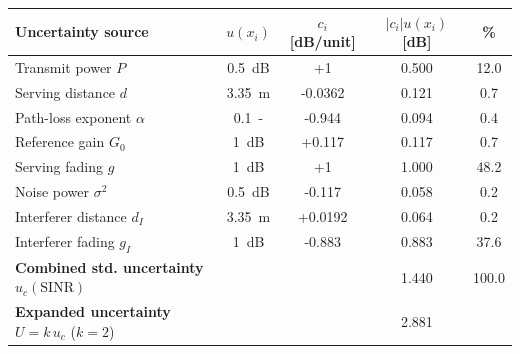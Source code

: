 \begin{tabular}{lcccc}
\hline
\textbf{Uncertainty source} & \textbf{$u(x_i)$} & \textbf{$c_i$ [dB/unit]} & \textbf{$|c_i|u(x_i)$ [dB]} & \textbf{\%} \\
\hline
Transmit power $P$ & 0.5~dB & +1 & 0.500 & 12.0 \\
Serving distance $d$ & 3.35~m & -0.0362 & 0.121 & 0.7 \\
Path-loss exponent $\alpha$ & 0.1~- & -0.944 & 0.094 & 0.4 \\
Reference gain $G_0$ & 1~dB & +0.117 & 0.117 & 0.7 \\
Serving fading $g$ & 1~dB & +1 & 1.000 & 48.2 \\
Noise power $\sigma^2$ & 0.5~dB & -0.117 & 0.058 & 0.2 \\
Interferer distance $d_I$ & 3.35~m & +0.0192 & 0.064 & 0.2 \\
Interferer fading $g_I$ & 1~dB & -0.883 & 0.883 & 37.6 \\
\hline
\textbf{Combined std. uncertainty } $u_c(\mathrm{SINR})$ & & & 1.440 & 100.0 \\
\textbf{Expanded uncertainty } $U=k\,u_c$ ($k=2$) & & & 2.881 & \\
\hline
\end{tabular}